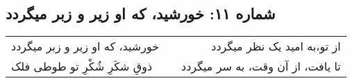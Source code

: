 \begin{center}
\section*{شماره ۱۱: خورشید، که او زیر و زبر میگردد}
\label{sec:011}
\begin{longtable}{l p{0.5cm} r}
خورشید، که او زیر و زبر میگردد
&&
از تو،‌به امید یک نظر میگردد
\\
ذوقِ شکَرِ شُکْرِ تو طوطی فلک 
&&
تا یافت، از آن وقت، به سر میگردد
\\
\end{longtable}
\end{center}
